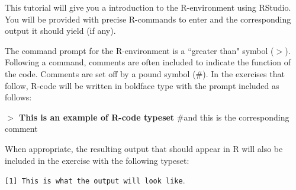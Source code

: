 \documentclass{article}
\newcommand{\Rin}[1]{\textbf{$>$ {#1}}}
\newcommand{\Rcom}[1]{\hspace{1cm} \#{#1}}
\newcommand{\Rout}[1]{\texttt{{#1}}}
\begin{document}
\pagestyle{myheadings}


\newpage
\begin{center}
\textbf{}
\end{center}

This tutorial will give you a  introduction to the R-environment using RStudio.  You will be provided with precise R-commands to enter and the corresponding output it should yield (if any).  

The command prompt for the R-environment is a ``greater than" symbol ($>$).  Following a command, comments are often included to indicate the function of the code.  Comments are set off by a pound symbol (\#).  In the exercises that follow, R-code will be written in boldface type with the prompt included as follows:
\begin{center}
\Rin{This is an example of R-code typeset} \Rcom{and this is the corresponding comment}
\end{center}
When appropriate, the resulting output that should appear in R will also be included in the exercise with the following typeset:
\begin{center}
\Rout{[1] This is what the output will look like}.
\end{center}
\end{document}
